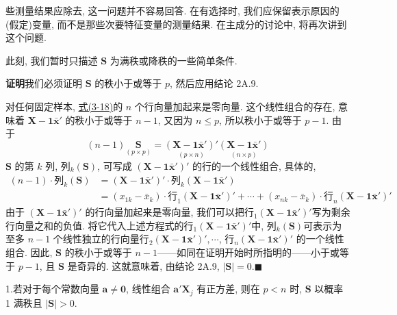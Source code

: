 
些测量结果应除去, 这一问题并不容易回答. 在有选择时, 我们应保留表示原因的(假定)变量, 而不是那些次要特征变量的测量结果. 在主成分的讨论中, 将再次讲到这个问题.

此刻, 我们暂时只描述 $\mathbf{S}$ 为满秩或降秩的一些简单条件.


\noindent\textbf{证明}\quad 我们必须证明 $\mathbf{S}$ 的秩小于或等于 $p$, 然后应用结论 2A.9.

对任何固定样本, \hyperref[eq:3-18]{式(3-18)}的 $n$ 个行向量加起来是零向量. 这个线性组合的存在, 意味着 $\mathbf{X}-\mathbf{1}\bar{\mathbf{x}}'$ 的秩小于或等于 $n-1$, 又因为 $n\le p$, 所以秩小于或等于 $p-1$. 由于
\[
(n-1)\underset{(p\times p)}{\mathbf{S}}=\underset{(p\times n)}{(\mathbf{X}-\mathbf{1}\bar{\mathbf{x}}')'}\underset{(n\times p)}{(\mathbf{X}-\mathbf{1}\bar{\mathbf{x}}')}
\]
$\mathbf{S}$ 的第 $k$ 列, 列$_{k}(\mathbf{S})$, 可写成 $(\mathbf{X}-\mathbf{1}\bar{\mathbf{x}}')'$ 的行的一个线性组合, 具体的,
\begin{align*}
(n-1)\cdot\text{列}_{k}(\mathbf{S})&=(\mathbf{X}-\mathbf{1}\bar{\mathbf{x}}')'\cdot\text{列}_{k}(\mathbf{X}-\mathbf{1}\bar{\mathbf{x}}')\\
&=(x_{1k}-\bar{x}_{k})\cdot\text{行}_{1}(\mathbf{X}-\mathbf{1}\bar{\mathbf{x}}')'+\cdots+(x_{nk}-\bar{x}_{k})\cdot\text{行}_{n}(\mathbf{X}-\mathbf{1}\bar{\mathbf{x}}')'
\end{align*}
由于 $(\mathbf{X}-\mathbf{1}\bar{\mathbf{x}}')'$ 的行向量加起来是零向量, 我们可以把行$_{1}(\mathbf{X}-\mathbf{1}\bar{\mathbf{x}}')'$写为剩余行向量之和的负值. 将它代入上述方程式的行$_{1}(\mathbf{X}-\mathbf{1}\bar{\mathbf{x}}')'$中, 列$_{k}(\mathbf{S})$可表示为至多 $n-1$ 个线性独立的行向量行$_{2}(\mathbf{X}-\mathbf{1}\bar{\mathbf{x}}')',\cdots$, 行$_{n}(\mathbf{X}-\mathbf{1}\bar{\mathbf{x}}')'$ 的一个线性组合. 因此, $\mathbf{S}$ 的秩小于或等于 $n-1$——如同在证明开始时所指明的——小于或等于 $p-1$, 且 $\mathbf{S}$ 是奇异的. 这就意味着, 由结论 2A.9, $|\mathbf{S}|=0$.\hfill$\blacksquare$


1.\quad 若对于每个常数向量 $\mathbf{a}\ne\mathbf{0}$, 线性组合 $\mathbf{a}'\mathbf{X}_{j}$ 有正方差, 则在 $p<n$ 时, $\mathbf{S}$ 以概率 1 满秩且 $|\mathbf{S}|>0$.

